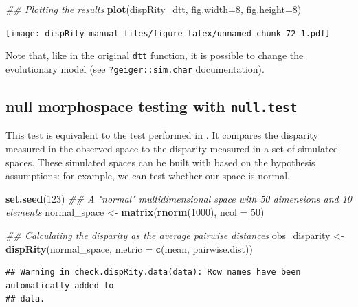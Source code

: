 \documentclass[]{book}
\newenvironment{Shaded}{\begin{snugshade}}{\end{snugshade}}
\newcommand{\CommentTok}[1]{\textcolor[rgb]{0.56,0.35,0.01}{\textit{#1}}}
\newcommand{\DataTypeTok}[1]{\textcolor[rgb]{0.13,0.29,0.53}{#1}}
\newcommand{\DecValTok}[1]{\textcolor[rgb]{0.00,0.00,0.81}{#1}}
\newcommand{\KeywordTok}[1]{\textcolor[rgb]{0.13,0.29,0.53}{\textbf{#1}}}
\newcommand{\NormalTok}[1]{#1}
\newcommand{\StringTok}[1]{\textcolor[rgb]{0.31,0.60,0.02}{#1}}
\begin{document}
\begin{Shaded}
\begin{Highlighting}[]
\CommentTok{## Plotting the results}
\KeywordTok{plot}\NormalTok{(dispRity_dtt, }\DataTypeTok{fig.width=}\DecValTok{8}\NormalTok{, }\DataTypeTok{fig.height=}\DecValTok{8}\NormalTok{)}
\end{Highlighting}
\end{Shaded}

\texttt{[image: dispRity\_manual\_files/figure-latex/unnamed-chunk-72-1.pdf]}

Note that, like in the original \texttt{dtt} function, it is possible to change the evolutionary model (see \texttt{?geiger::sim.char} documentation).

\hypertarget{null-morphospace-testing-with-null.test}{%
\subsection{\texorpdfstring{null morphospace testing with \texttt{null.test}}{null morphospace testing with null.test}}\label{null-morphospace-testing-with-null.test}}

This test is equivalent to the test performed in \citet{diaz2016global}.
It compares the disparity measured in the observed space to the disparity measured in a set of simulated spaces.
These simulated spaces can be built with based on the hypothesis assumptions: for example, we can test whether our space is normal.

\begin{Shaded}
\begin{Highlighting}[]
\KeywordTok{set.seed}\NormalTok{(}\DecValTok{123}\NormalTok{)}
\CommentTok{## A "normal" multidimensional space with 50 dimensions and 10 elements}
\NormalTok{normal_space <-}\StringTok{ }\KeywordTok{matrix}\NormalTok{(}\KeywordTok{rnorm}\NormalTok{(}\DecValTok{1000}\NormalTok{), }\DataTypeTok{ncol =} \DecValTok{50}\NormalTok{)}

\CommentTok{## Calculating the disparity as the average pairwise distances}
\NormalTok{obs_disparity <-}\StringTok{ }\KeywordTok{dispRity}\NormalTok{(normal_space,}
                          \DataTypeTok{metric =} \KeywordTok{c}\NormalTok{(mean, pairwise.dist))}
\end{Highlighting}
\end{Shaded}

\begin{verbatim}
## Warning in check.dispRity.data(data): Row names have been automatically added to
## data.
\end{verbatim}
\end{document}
